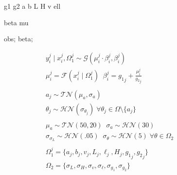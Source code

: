 \documentclass[a4paper,12pt]{article}
\begin{document}
\begin{minipage}{.5\textwidth}
\begin{figure}[H]
{            %

             {g1}
             {g2}
             {a}
             {b}
             {L}
             {H}
             {v}
             {ell}

             {beta}
             {mu}

             {obs};
             {beta};
        }
    \end{figure}
\end{minipage}
\begin{minipage}{.6\textwidth}
    \begin{align*}
        &y_i^j \mid x_i^j, \Omega_1^j \sim \mathcal{G}\left(\mu_i^j\cdot\beta_i^j, \beta_i^j\right) \\
        &\mu_i^j = \mathcal{F}\left(x_i^j \mid \Omega_1^j\right) \;\; \beta_i^j = {g_1}_j + \frac{\mu_i^j}{{g_2}_j}\\\\
        &a_j \sim \mathcal{TN}\left(\mu_a, \sigma_a\right)\\
        &\theta_j \sim \mathcal{HN}\left(\sigma_{\theta_j}\right) \; \forall \theta_j \in \Omega \setminus \{a_j\}\\\\
        & \mu_a \sim \mathcal{TN}\left(50, 20\right)\;\; \sigma_a \sim \mathcal{HN}\left(30\right)\\
        &\sigma_{\sigma_L} \sim \mathcal{HN}\left(.05\right) \;\; \sigma_\theta \sim \mathcal{HN}\left(5\right) \;\forall \theta \in \Omega_2\\\\
        &\Omega_1^j = \{ a_j, b_j, v_j, L_j, \ell_j, H_j, {g_1}_j, {g_2}_j\}\\
        &\Omega_2 = \{\sigma_{L}, \sigma_{H}, \sigma_{v}, \sigma_{\ell}, \sigma_{g_1}, \sigma_{g_2}\}
    \end{align*}
\end{minipage}
\end{document}
